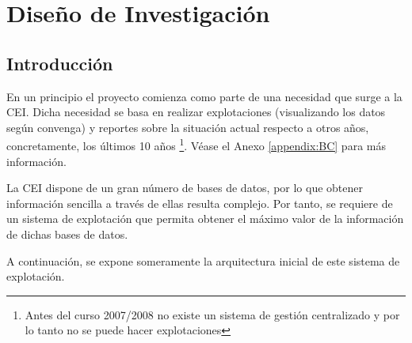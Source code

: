 \chapter{Diseño de Investigación}

\section{Introducción}
En un principio el proyecto comienza como parte de una necesidad que surge a la CEI. Dicha necesidad se basa en realizar explotaciones (visualizando los datos según convenga) y reportes sobre la situación actual respecto a otros años, concretamente, los últimos 10 años \footnote{Antes del curso 2007/2008 no existe un sistema de gestión centralizado y por lo tanto no se puede hacer explotaciones}. Véase el Anexo \ref{appendix:BC} para más información.

La CEI dispone de un gran número de bases de datos, por lo que obtener información sencilla a través de ellas resulta complejo. Por tanto, se requiere de un sistema de explotación que permita obtener el máximo valor de la información de dichas bases de datos.


A continuación, se expone someramente la arquitectura inicial de este sistema de explotación.




